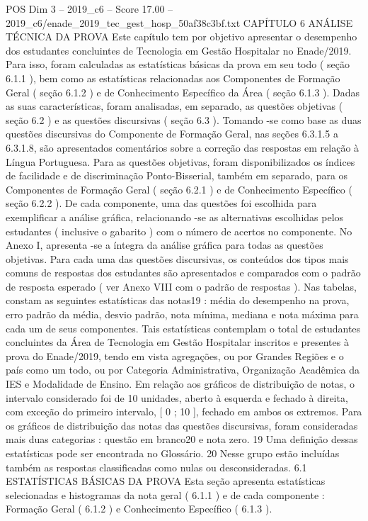 \begin{textsample}{POS Dim 3 – 2019\_c6 – Score 17.00 – 2019\_c6/enade\_2019\_tec\_gest\_hosp\_50af38c3bf.txt}  \label{ex:f3_pos_002}
CAPÍTULO 6 ANÁLISE TÉCNICA DA PROVA Este capítulo tem por objetivo apresentar o desempenho dos estudantes concluintes de Tecnologia em Gestão Hospitalar no Enade/2019.
Para isso, foram calculadas as estatísticas básicas da prova em seu todo ( seção 6.1.1 ), bem como as estatísticas relacionadas aos Componentes de Formação Geral ( seção 6.1.2 ) e de Conhecimento Específico da Área ( seção 6.1.3 ).
Dadas as suas características, foram analisadas, em separado, as questões objetivas ( seção 6.2 ) e as questões discursivas ( seção 6.3 ).
Tomando -se como base as duas questões discursivas do Componente de Formação Geral, nas seções 6.3.1.5 a 6.3.1.8, são apresentados comentários sobre a correção das respostas em relação à Língua Portuguesa.
Para as questões objetivas, foram disponibilizados os índices de facilidade e de discriminação Ponto-Bisserial, também em separado, para os Componentes de Formação Geral ( seção 6.2.1 ) e de Conhecimento Específico ( seção 6.2.2 ).
De cada componente, uma das questões foi escolhida para exemplificar a análise gráfica, relacionando -se as alternativas escolhidas pelos estudantes ( inclusive o gabarito ) com o número de acertos no componente.
No Anexo I, apresenta -se a íntegra da análise gráfica para todas as questões objetivas.
Para cada uma das questões discursivas, os conteúdos dos tipos mais comuns de respostas dos estudantes são apresentados e comparados com o padrão de resposta esperado ( ver Anexo VIII com o padrão de respostas ).
Nas tabelas, constam as seguintes estatísticas das notas19 : média do desempenho na prova, erro padrão da média, desvio padrão, nota mínima, mediana e nota máxima para cada um de seus componentes.
Tais estatísticas contemplam o total de estudantes concluintes da Área de Tecnologia em Gestão Hospitalar inscritos e presentes à prova do Enade/2019, tendo em vista agregações, ou por Grandes Regiões e o país como um todo, ou por Categoria Administrativa, Organização Acadêmica da IES e Modalidade de Ensino.
Em relação aos gráficos de distribuição de notas, o intervalo considerado foi de 10 unidades, aberto à esquerda e fechado à direita, com exceção do primeiro intervalo, [ 0 ; 10 ], fechado em ambos os extremos.
Para os gráficos de distribuição das notas das questões discursivas, foram consideradas mais duas categorias : questão em branco20 e nota zero. 19 Uma definição dessas estatísticas pode ser encontrada no Glossário. 20 Nesse grupo estão incluídas também as respostas classificadas como nulas ou desconsideradas. 6.1 ESTATÍSTICAS BÁSICAS DA PROVA Esta seção apresenta estatísticas selecionadas e histogramas da nota geral ( 6.1.1 ) e de cada componente : Formação Geral ( 6.1.2 ) e Conhecimento Específico ( 6.1.3 ).

\end{textsample}
